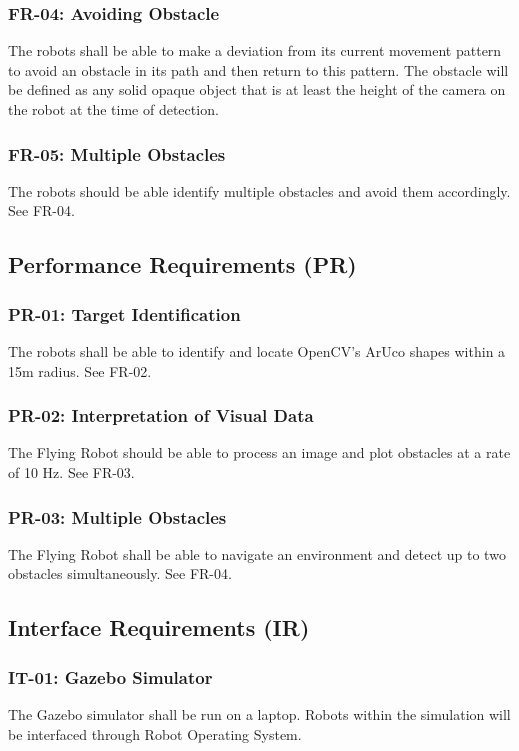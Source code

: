 \documentclass{article}
\begin{document}
		\subsubsection{FR-04: Avoiding Obstacle}
		The robots shall be able to make a deviation from its current movement pattern to avoid an obstacle in its path and then return to this pattern. The obstacle will be defined as any solid opaque object that is at least the height of the camera on the robot at the time of detection.
		
		\subsubsection{FR-05: Multiple Obstacles}
		The robots should be able identify multiple obstacles and avoid them accordingly. See FR-04. 
		
	\subsection{Performance Requirements (PR)}
	
		\subsubsection{PR-01: Target Identification}
		
		The robots shall be able to identify and locate OpenCV's ArUco shapes within a 15m radius. See FR-02.
		
		\subsubsection{PR-02: Interpretation of Visual Data}
		
		The Flying Robot should be able to process an image and plot obstacles at a rate of 10 Hz. See FR-03.
		
		\subsubsection{PR-03: Multiple Obstacles}
		
		The Flying Robot shall be able to navigate an environment and detect up to two obstacles simultaneously. See FR-04.
		
	\subsection{Interface Requirements (IR)}

		\subsubsection{IT-01: Gazebo Simulator}
		The Gazebo simulator shall be run on a laptop. Robots within the simulation will be interfaced through Robot Operating System.
	
\end{document}
